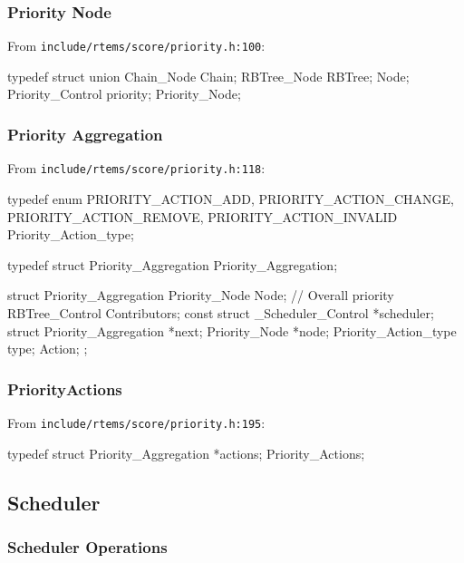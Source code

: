 \subsubsection{Priority Node}

From \texttt{include/rtems/score/priority.h:100}:
\begin{nicec}
typedef struct {
  union {
    Chain_Node Chain;
    RBTree_Node RBTree;
  } Node;
  Priority_Control priority;
} Priority_Node;
\end{nicec}

\subsubsection{Priority Aggregation}

From \texttt{include/rtems/score/priority.h:118}:
\begin{nicec}
typedef enum {
  PRIORITY_ACTION_ADD,
  PRIORITY_ACTION_CHANGE,
  PRIORITY_ACTION_REMOVE,
  PRIORITY_ACTION_INVALID
} Priority_Action_type;

typedef struct Priority_Aggregation Priority_Aggregation;

struct Priority_Aggregation {
  Priority_Node Node; // Overall priority
  RBTree_Control Contributors;
  const struct _Scheduler_Control *scheduler;
  struct {
    Priority_Aggregation *next;
    Priority_Node *node;
    Priority_Action_type type;
  } Action;
};
\end{nicec}

\subsubsection{PriorityActions}

From \texttt{include/rtems/score/priority.h:195}:
\begin{nicec}
typedef struct {
  Priority_Aggregation *actions;
} Priority_Actions;
\end{nicec}

\newpage
\subsection{Scheduler}

\subsubsection{Scheduler Operations}


